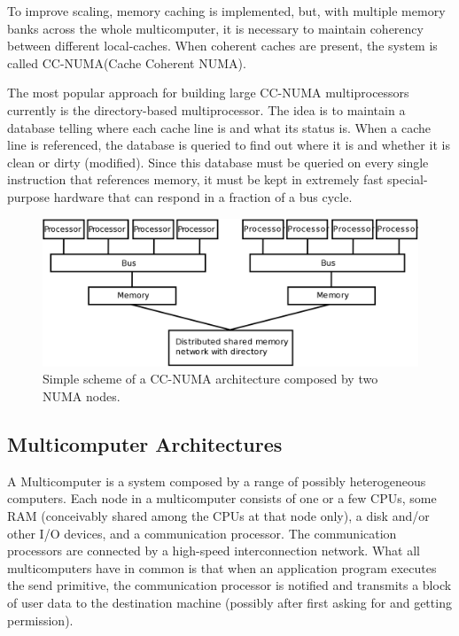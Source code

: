 \documentclass[a4paper,12pt]{article}
\begin{document}
To improve scaling, memory caching is implemented, but, with multiple memory banks across the whole multicomputer, it is necessary to maintain coherency between different local-caches.  
When coherent caches are present, the system is called CC-NUMA(Cache Coherent NUMA).

The most popular approach for building large CC-NUMA  multiprocessors currently is the directory-based multiprocessor. The
idea is to maintain a database telling where each cache line is and what its status is.
When a cache line is referenced, the database is queried to find out where it is and
whether it is clean or dirty (modified). Since this database must be queried on
every single instruction that references memory, it must be kept in extremely fast
special-purpose hardware that can respond in a fraction of a bus cycle.

\begin{figure}[hhh!]
\begin{center}
	\includegraphics[width=\linewidth]{NumaScheme.png}	
	\caption{Simple scheme of a CC-NUMA architecture composed by two NUMA nodes.}
	\label{fig:sgiLoad}
\end{center}
\end{figure}

\subsection{Multicomputer Architectures}
A Multicomputer is a system composed by a range of possibly heterogeneous computers.
Each node in a multicomputer consists of one or a few CPUs, some RAM (conceivably shared among the CPUs at that node only), a disk and/or other I/O devices, and a communication processor. 
The communication processors are connected by a high-speed interconnection network. 
What all multicomputers have in common is that when an application program executes the send primitive, the communication processor is notified and transmits a block of user data to the destination machine (possibly after first asking for and getting permission).
\end{document}
